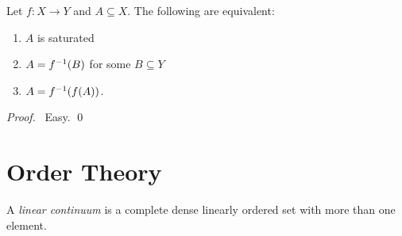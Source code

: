 \begin{prop}
  Let $f : X \rightarrow Y$ and $A \subseteq X$. The following are equivalent:
  \begin{enumerate}
    \item $A$ is saturated
    \item $A = {f}^{-1}(B)$ for some $B \subseteq Y$
    \item $A = {f}^{-1}(f(A))$.
  \end{enumerate}
\end{prop}

\begin{proof}
  \pf\ Easy. \qed
\end{proof}

\chapter{Order Theory}

\begin{df}
  A \emph{linear continuum} is a complete dense linearly ordered set with more than one element.
\end{df}
